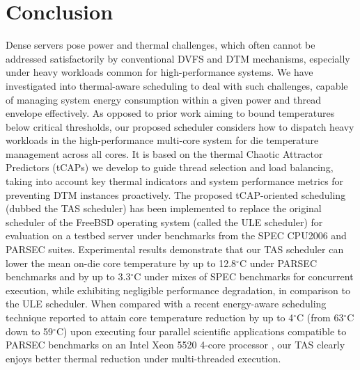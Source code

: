 \documentclass[times, 10pt,twocolumn]{IEEEtran}
\begin{document}
\section{Conclusion}
\label{sec:conclusion}
Dense servers pose power and thermal challenges, which often cannot be
addressed satisfactorily by conventional DVFS and DTM mechanisms,
especially under heavy workloads common for high-performance systems.
We have investigated into thermal-aware scheduling to deal with such
challenges, capable of managing system energy consumption within a given
power and thread envelope effectively.  As opposed to prior work aiming
to bound temperatures below critical thresholds, our proposed scheduler
considers how to dispatch heavy workloads in the high-performance
multi-core system for die temperature management across all cores.  It
is based on the thermal Chaotic Attractor Predictors (tCAPs) we develop
to guide thread selection and load balancing, taking into account key
thermal indicators and system performance metrics for preventing DTM
instances proactively.  The proposed tCAP-oriented scheduling (dubbed
the TAS scheduler) has been implemented to replace the original
scheduler of the FreeBSD operating system (called the ULE scheduler) for
evaluation on a testbed server under benchmarks from the SPEC CPU2006
and PARSEC suites.  Experimental results demonstrate that our TAS
scheduler can lower the mean on-die core temperature by up to
12.8$^{\circ}$C  
under PARSEC benchmarks and by up to 3.3$^{\circ}$C under
mixes of SPEC benchmarks for concurrent execution, while exhibiting
negligible performance degradation, in comparison to the ULE scheduler.
When compared with a recent energy-aware scheduling technique reported
to attain core temperature reduction by up to 4$^\circ$C 
(from 63$^\circ$C down to 59$^\circ$C) upon executing 
four parallel scientific applications compatible to PARSEC benchmarks 
on an Intel Xeon 5520 4-core processor \cite{Sarood2011}, our TAS
clearly enjoys better thermal reduction under multi-threaded execution.

\label{sec:references}


\end{document}
